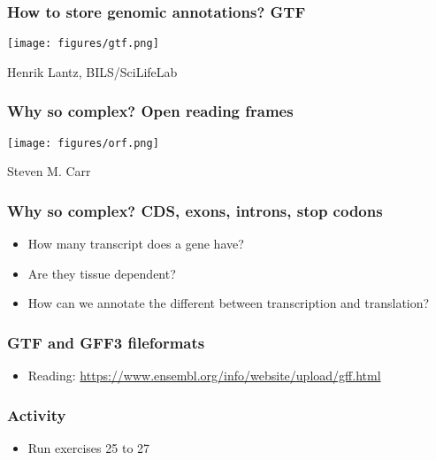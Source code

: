 \documentclass{beamer}
\begin{document}
\begin{frame}
  \frametitle{How to store genomic annotations? GTF}
  
\centering
\texttt{[image: figures/gtf.png]}

Henrik Lantz, BILS/SciLifeLab
\end{frame}



\begin{frame}
  \frametitle{Why so complex? Open reading frames}
  
\centering
\texttt{[image: figures/orf.png]}

Steven M. Carr 
\end{frame}


\begin{frame}
  \frametitle{Why so complex? CDS, exons, introns, stop codons}
  \begin{itemize}
  \item How many transcript does a gene have?
  \item Are they tissue dependent?
  \item How can we annotate the different between transcription and translation?
  \end{itemize}

\end{frame}

\begin{frame}
  \frametitle{GTF and GFF3 fileformats}
  \begin{itemize}
  \item Reading: \url{https://www.ensembl.org/info/website/upload/gff.html}
  \end{itemize}
\end{frame}


\begin{frame}
  \frametitle{Activity}
  \begin{itemize}
  \item Run exercises 25 to 27
  \end{itemize}
\end{frame}


\end{document}
